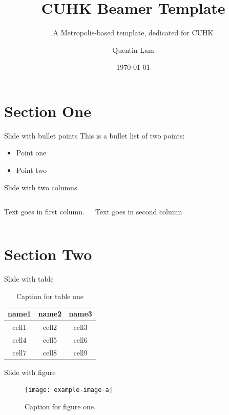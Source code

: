 \documentclass{beamer}
\title{CUHK Beamer Template}
\subtitle{A Metropolis-based template, dedicated for CUHK}
\date{\today}
\author{Quentin Lam}
\institute{Department of Psychology, the Chinese University of Hong Kong}
\begin{document}
    \maketitle
    \tableofcontents

    \section{Section One}
    \begin{frame}{Slide with bullet points}
        This is a bullet list of two points:
        \begin{itemize}
            \item Point one
            \item Point two
        \end{itemize}
    \end{frame}

    \begin{frame}{Slide with two columns}
        \begin{columns}
            Text goes in first column.
            
            Text goes in second column
        \end{columns}
    \end{frame}

    \section{Section Two}

    \begin{frame}{Slide with table}
        \begin{table}
            \centering
            \begin{tabular}{ccc}
                \hline
                \textbf{name1} & \textbf{name2} & \textbf{name3} \\
                \hline 
                cell1 & cell2 & cell3 \\ 
                cell4 & cell5 & cell6 \\ 
                cell7 & cell8 & cell9 \\ 
                \hline
            \end{tabular}
            \caption{Caption for table one}
            \label{tab:table1}
        \end{table}
    \end{frame}

    \begin{frame}{Slide with figure}
        \begin{figure}[H]
            \centering
            \texttt{[image: example-image-a]}
            \caption{Caption for figure one.}
            \label{fig:figure1}
        \end{figure}
    \end{frame}
\end{document}
